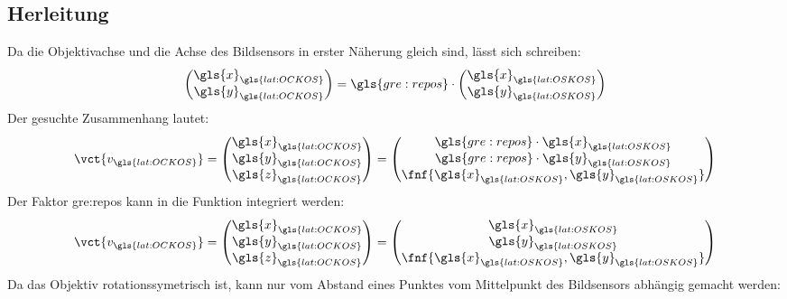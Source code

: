 \subsection{Herleitung}
Da die Objektivachse und die Achse des Bildsensors in erster Näherung gleich sind, lässt sich schreiben:
\begin{equation}
\begin{pmatrix}
\gls{x}_{\gls{lat:OCKOS}} \\ \gls{y}_{\gls{lat:OCKOS}}
\end{pmatrix}
= \gls{gre:repos} \cdot
\begin{pmatrix}
\gls{x}_{\gls{lat:OSKOS}} \\ \gls{y}_{\gls{lat:OSKOS}}
\end{pmatrix}
\end{equation}
Der gesuchte Zusammenhang lautet: 
\begin{equation}
\vct{v_{\gls{lat:OCKOS}}} =
\begin{pmatrix}
\gls{x}_{\gls{lat:OCKOS}} \\ \gls{y}_{\gls{lat:OCKOS}} \\ \gls{z}_{\gls{lat:OCKOS}}
\end{pmatrix}
=
\begin{pmatrix}
\gls{gre:repos} \cdot \gls{x}_{\gls{lat:OSKOS}} \\  \gls{gre:repos} \cdot \gls{y}_{\gls{lat:OSKOS}} \\ \fnf{\gls{x}_{\gls{lat:OSKOS}},\gls{y}_{\gls{lat:OSKOS}}}
\end{pmatrix}
\end{equation}
Der Faktor  \gls{gre:repos} kann in die Funktion  integriert werden:
\begin{equation}
\label{eq:ocamcalibuv}
\vct{v_{\gls{lat:OCKOS}}} =
\begin{pmatrix}
\gls{x}_{\gls{lat:OCKOS}} \\ \gls{y}_{\gls{lat:OCKOS}} \\ \gls{z}_{\gls{lat:OCKOS}}
\end{pmatrix}
=
\begin{pmatrix}
\gls{x}_{\gls{lat:OSKOS}} \\ \gls{y}_{\gls{lat:OSKOS}} \\ \fnf{\gls{x}_{\gls{lat:OSKOS}},\gls{y}_{\gls{lat:OSKOS}}}
\end{pmatrix}
\end{equation}
Da das Objektiv rotationssymetrisch ist, kann  nur vom Abstand eines Punktes vom Mittelpunkt des Bildsensors abhängig gemacht werden:
